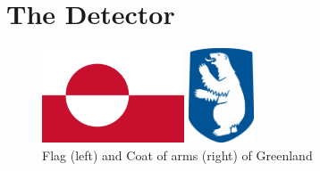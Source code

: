 \documentclass[11pt,a4paper,faculty=we,language=en,doctype=report]{cls/ugent-doc}
\begin{document}
\chapter{The Detector}
\begin{figure}
  \begin{minipage}{0.49\textwidth}
      \centering
      \includegraphics[height=2.8cm]{figures/GreenlandFlag.pdf}
  \end{minipage}
  \begin{minipage}{0.49\textwidth}
      \centering
      \includegraphics[height=2.8cm]{figures/CoatOfArms.pdf}
  \end{minipage}
  \caption{Flag (left) and Coat of arms (right) of Greenland}
  \label{fig:FlagAndArms}
\end{figure}
\end{document}
